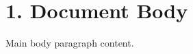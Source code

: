 \documentclass[11pt,a4paper]{article}
\begin{document}
\section{1. Document Body}

Main body paragraph content.
\end{document}
